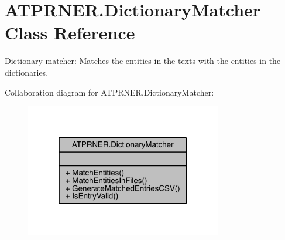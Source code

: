 \hypertarget{class_a_t_p_r_n_e_r_1_1_dictionary_matcher}{}\section{A\+T\+P\+R\+N\+E\+R.\+Dictionary\+Matcher Class Reference}
\label{class_a_t_p_r_n_e_r_1_1_dictionary_matcher}


Dictionary matcher\+: Matches the entities in the texts with the entities in the dictionaries.  




Collaboration diagram for A\+T\+P\+R\+N\+E\+R.\+Dictionary\+Matcher\+:
\nopagebreak
\begin{figure}[H]
\begin{center}
\leavevmode
\includegraphics[width=243pt]{db/d42/class_a_t_p_r_n_e_r_1_1_dictionary_matcher__coll__graph}
\end{center}
\end{figure}
